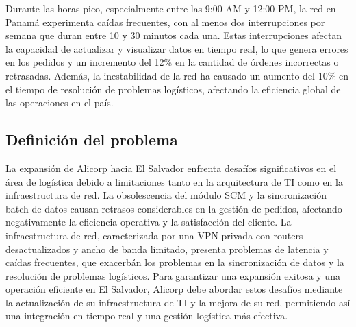 Durante las horas pico, especialmente entre las 9:00 AM y 12:00 PM, la red en Panamá experimenta caídas frecuentes, con al menos dos interrupciones por semana que duran entre 10 y 30 minutos cada una. Estas interrupciones afectan la capacidad de actualizar y visualizar datos en tiempo real, lo que genera errores en los pedidos y un incremento del 12\% en la cantidad de órdenes incorrectas o retrasadas. Además, la inestabilidad de la red ha causado un aumento del 10\% en el tiempo de resolución de problemas logísticos, afectando la eficiencia global de las operaciones en el país.

\subsection{Definición del problema}

La expansión de Alicorp hacia El Salvador enfrenta desafíos significativos en el área de logística debido a limitaciones tanto en la arquitectura de TI como en la infraestructura de red. La obsolescencia del módulo SCM y la sincronización batch de datos causan retrasos considerables en la gestión de pedidos, afectando negativamente la eficiencia operativa y la satisfacción del cliente. La infraestructura de red, caracterizada por una VPN privada con routers desactualizados y ancho de banda limitado, presenta problemas de latencia y caídas frecuentes, que exacerbán los problemas en la sincronización de datos y la resolución de problemas logísticos. Para garantizar una expansión exitosa y una operación eficiente en El Salvador, Alicorp debe abordar estos desafíos mediante la actualización de su infraestructura de TI y la mejora de su red, permitiendo así una integración en tiempo real y una gestión logística más efectiva.